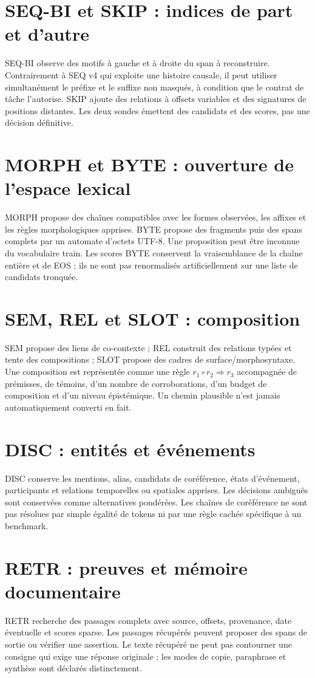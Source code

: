 \documentclass[11pt,a4paper,oneside]{report}
\begin{document}
\section{SEQ-BI et SKIP : indices de part et d'autre}
SEQ-BI observe des motifs à gauche et à droite du span à reconstruire. Contrairement à SEQ v4 qui exploite une histoire causale, il peut utiliser simultanément le préfixe et le suffixe non masqués, à condition que le contrat de tâche l'autorise. SKIP ajoute des relations à offsets variables et des signatures de positions distantes. Les deux sondes émettent des candidats et des scores, pas une décision définitive.

\section{MORPH et BYTE : ouverture de l'espace lexical}
MORPH propose des chaînes compatibles avec les formes observées, les affixes et les règles morphologiques apprises. BYTE propose des fragments puis des spans complets par un automate d'octets UTF-8. Une proposition peut être inconnue du vocabulaire train. Les scores BYTE conservent la vraisemblance de la chaîne entière et de EOS ; ils ne sont pas renormalisés artificiellement sur une liste de candidats tronquée.

\section{SEM, REL et SLOT : composition}
SEM propose des liens de co-contexte ; REL construit des relations typées et tente des compositions ; SLOT propose des cadres de surface/morphosyntaxe. Une composition est représentée comme une règle $r_1\circ r_2\Rightarrow r_3$ accompagnée de prémisses, de témoins, d'un nombre de corroborations, d'un budget de composition et d'un niveau épistémique. Un chemin plausible n'est jamais automatiquement converti en fait.

\section{DISC : entités et événements}
DISC conserve les mentions, alias, candidats de coréférence, états d'événement, participants et relations temporelles ou spatiales apprises. Les décisions ambiguës sont conservées comme alternatives pondérées. Les chaînes de coréférence ne sont pas résolues par simple égalité de tokens ni par une règle cachée spécifique à un benchmark.

\section{RETR : preuves et mémoire documentaire}
RETR recherche des passages complets avec source, offsets, provenance, date éventuelle et scores sparse. Les passages récupérés peuvent proposer des spans de sortie ou vérifier une assertion. Le texte récupéré ne peut pas contourner une consigne qui exige une réponse originale ; les modes de copie, paraphrase et synthèse sont déclarés distinctement.
\end{document}

